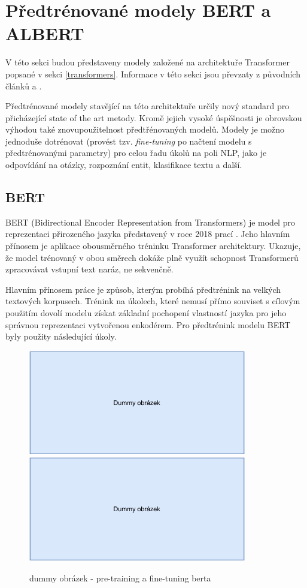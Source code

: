 \section{Předtrénované modely BERT a ALBERT}
\label{bert_albert}

V této sekci budou představeny modely založené na architektuře Transformer popsané v sekci \ref{transformers}. Informace v této sekci jsou převzaty z původních článků \cite{BERT} a \cite{ALBERT}.\par
Předtrénované modely stavějící na této architektuře určily nový standard pro přicházející state of the art metody. Kromě jejich vysoké úspěšnosti je obrovskou výhodou také znovupoužitelnost předtřénovaných modelů. Modely je možno jednoduše dotrénovat (provést tzv. \emph{fine-tuning} po načtení modelu s předtrénovanými parametry) pro celou řadu úkolů na poli NLP, jako je odpovídání na otázky, rozpoznání entit, klasifikace textu a další.

\subsection{BERT}
BERT (Bidirectional Encoder Representation from Transformers) je model pro reprezentaci přirozeného jazyka představený v roce 2018 prací \cite{BERT}. Jeho hlavním přínosem je aplikace obousměrného tréninku Transformer architektury. Ukazuje, že model trénovaný v obou směrech dokáže plně využít schopnost Transformerů zpracovávat vstupní text naráz, ne sekvenčně.\par\smallskip
Hlavním přínosem práce \cite{BERT} je způsob, kterým probíhá předtrénink na velkých textových korpusech. Trénink na úkolech, které nemusí přímo souviset s cílovým použitím dovolí modelu získat základní pochopení vlastností jazyka pro jeho správnou reprezentaci vytvořenou enkodérem. Pro předtrénink modelu BERT byly použity následující úkoly.

\begin{figure}[hbt]
	\centering
	\includegraphics[width=0.45\linewidth, height=1.8in]{obrazky/dummy_pic.pdf}\hfill
	\includegraphics[width=0.45\linewidth, height=1.8in]{obrazky/dummy_pic.pdf}\hfill
	\caption{dummy obrázek - pre-training a fine-tuning berta}
	\label{bert}
\end{figure}

